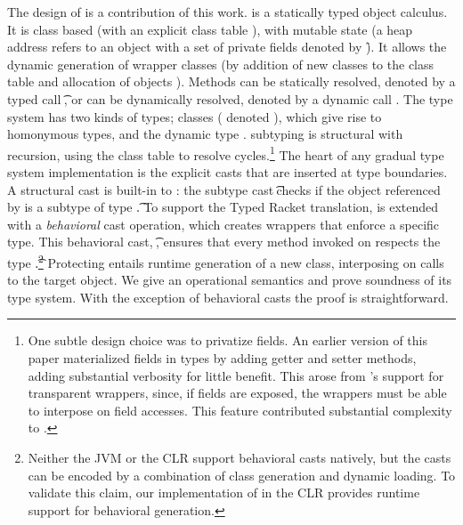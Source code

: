 \documentclass[acmlarge, anonymous, authordraft, review]{acmart} %
\begin{document}
The design of \kafka is a contribution of this work.  \kafka is a statically
typed object calculus.  It is class based (with an explicit class table \K),
with mutable state (a heap address \a refers to an object with a set of
private fields denoted by \f). It allows the dynamic generation of wrapper
classes (by addition of new classes to the class table \K and allocation of
objects \a).  Methods can be statically resolved, denoted by a typed call
\KCall\a\m\x\t\tp, or can be dynamically resolved, denoted by a dynamic call
\DynCall\a\m\x. The \kafka type system has two kinds of types; classes (
denoted \C), which give rise to homonymous types, and the dynamic type \any.
\kafka subtyping is structural with recursion, using the class table \K to
resolve cycles.\footnote{One subtle design choice was to privatize fields.
  An earlier version of this paper materialized fields in types by adding
  getter and setter methods, adding substantial verbosity for little
  benefit.  This arose from \kafka's support for transparent wrappers,
  since, if fields are exposed, the wrappers must be able to interpose on
  field accesses. This feature contributed substantial complexity to
  \kafka.} The heart of any gradual type system implementation is the
explicit casts that are inserted at type boundaries.  A structural cast is
built-in to \kafka: the subtype cast \SubCast\t\a checks if the object
referenced by \a is a subtype of type \t.  To support the Typed Racket
translation, \kafka is extended with a \emph{behavioral} cast operation,
which creates wrappers that enforce a specific type. This behavioral cast,
\BehCast\t\a, ensures that every method \m invoked on \a respects the type
\t.\footnote{Neither the JVM or the CLR support behavioral casts natively,
  but the casts can be encoded by a combination of class generation and
  dynamic loading. To validate this claim, our implementation of \kafka in
  the CLR provides runtime support for behavioral generation.} Protecting \a
entails runtime generation of a new class, interposing on calls to the
target object. We give \kafka an operational semantics and prove soundness
of its type system. With the exception of behavioral casts the proof is
straightforward.
\end{document}
